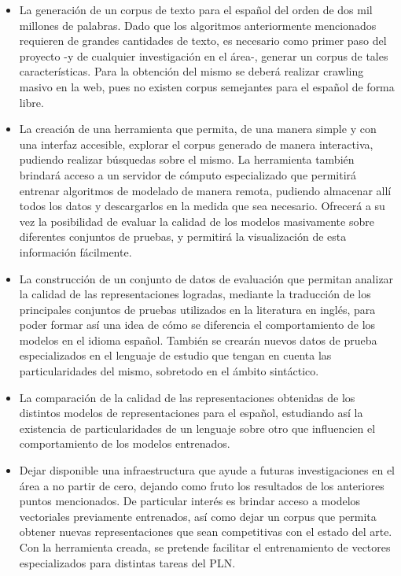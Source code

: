 \begin{itemize}

\item La generación de un corpus de texto para el español del orden de dos mil millones de
palabras. Dado que los algoritmos anteriormente mencionados requieren de grandes cantidades de
texto, es necesario como primer paso del proyecto -y de cualquier investigación en el área-, generar
un corpus de tales características. Para la obtención del mismo se deberá realizar crawling masivo
en la web, pues no existen corpus semejantes para el español de forma libre.

\item La creación de una herramienta que permita, de una manera simple y con una interfaz accesible,
explorar el corpus generado de manera interactiva, pudiendo realizar búsquedas sobre el mismo. La
herramienta también brindará acceso a un servidor de cómputo especializado que permitirá entrenar
algoritmos de modelado de manera remota, pudiendo almacenar allí todos los datos y descargarlos en
la medida que sea necesario. Ofrecerá a su vez la posibilidad de evaluar la calidad de los modelos
masivamente sobre diferentes conjuntos de pruebas, y permitirá la visualización de esta información
fácilmente.

\item La construcción de un conjunto de datos de evaluación que permitan analizar la calidad de las
representaciones logradas, mediante la traducción de los principales conjuntos de pruebas utilizados
en la literatura en inglés, para poder formar así una idea de cómo se diferencia el comportamiento
de los modelos en el idioma español. También se crearán nuevos datos de prueba especializados en el
lenguaje de estudio que tengan en cuenta las particularidades del mismo, sobretodo en el ámbito
sintáctico.

\item La comparación de la calidad de las representaciones obtenidas de los distintos modelos de
representaciones para el español, estudiando así la existencia de particularidades de un lenguaje
sobre otro que influencien el comportamiento de los modelos entrenados.

\item Dejar disponible una infraestructura que ayude a futuras investigaciones en el área a no
partir de cero, dejando como fruto los resultados de los anteriores puntos mencionados. De
particular interés es brindar acceso a modelos vectoriales previamente entrenados, así como dejar un
corpus que permita obtener nuevas representaciones que sean competitivas con el estado del arte. Con
la herramienta creada, se pretende facilitar el entrenamiento de vectores especializados para
distintas tareas del PLN\@.

\end{itemize}


